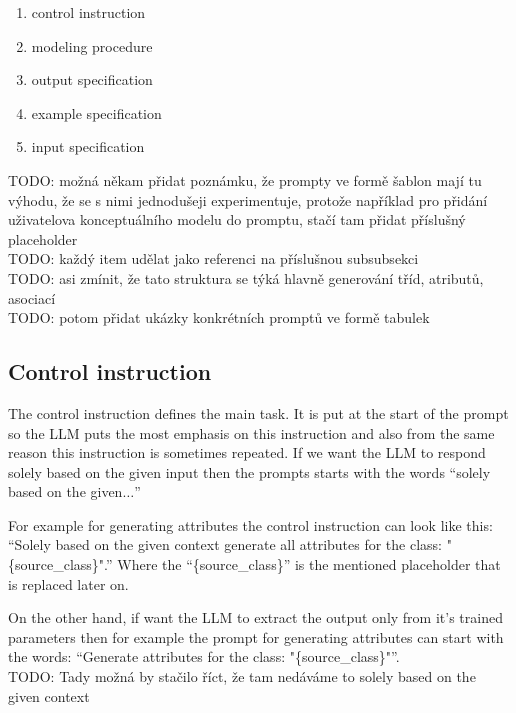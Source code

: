 \begin{enumerate}
\item control instruction
\item modeling procedure
\item output specification
\item example specification
\item input specification \\
\end{enumerate}

TODO: možná někam přidat poznámku, že prompty ve formě šablon mají tu výhodu, že se s nimi jednodušeji experimentuje, protože například pro přidání uživatelova konceptuálního modelu do promptu, stačí tam přidat příslušný placeholder \\

TODO: každý item udělat jako referenci na příslušnou subsubsekci \\

TODO: asi zmínit, že tato struktura se týká hlavně generování tříd, atributů, asociací \\

TODO: potom přidat ukázky konkrétních promptů ve formě tabulek


\subsection{Control instruction}
The control instruction defines the main task. It is put at the start of the prompt so the LLM puts the most emphasis on this instruction and also from the same reason this instruction is sometimes repeated. If we want the LLM to respond solely based on the given input then the prompts starts with the words ``solely based on the given$\ldots$''

For example for generating attributes the control instruction can look like this:
``Solely based on the given context generate all attributes for the class: "\{source\_class\}".'' Where the ``\{source\_class\}'' is the mentioned placeholder that is replaced later on.

On the other hand, if want the LLM to extract the output only from it's trained parameters then for example the prompt for generating attributes can start with the words: ``Generate attributes for the class: "\{source\_class\}"''. \\

TODO: Tady možná by stačilo říct, že tam nedáváme to solely based on the given context \\


